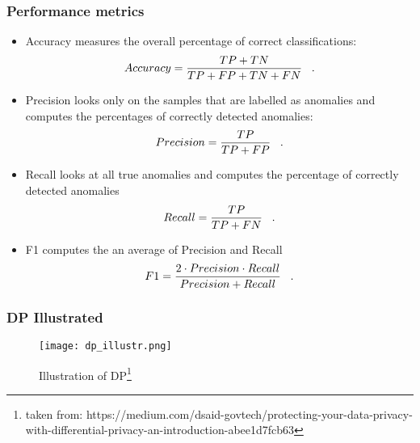 \begin{frame}
    \frametitle{Performance metrics}
    \begin{itemize}
        \item Accuracy measures the overall percentage of correct classifications:
        \begin{align}
            Accuracy = \frac{TP+TN}{TP+FP+TN+FN} \;\;\;.
        \end{align}
        \item Precision looks only on the samples that are labelled as anomalies and computes the percentages of correctly detected anomalies:
        \begin{align}
            Precision = \frac{TP}{TP+FP} \;\;\;.
        \end{align}
        \item Recall looks at all true anomalies and computes the percentage of correctly detected anomalies
        \begin{align}
            Recall = \frac{TP}{TP+FN} \;\;\;.
        \end{align}
        \item F1 computes the an average of Precision and Recall
        \begin{align}
            F1 = \frac{2\cdot Precision\cdot Recall}{Precision + Recall} \;\;\;.
        \end{align}
    \end{itemize}
    

\end{frame}

\begin{frame}
    \frametitle{DP Illustrated}

    \begin{figure}[h]
        \centering
        \texttt{[image: dp\_illustr.png]}
        \caption{Illustration of DP\footnote{taken from: https://medium.com/dsaid-govtech/protecting-your-data-privacy-with-differential-privacy-an-introduction-abee1d7fcb63}}
        \label{fig:enter-label}
    \end{figure}

\end{frame}

